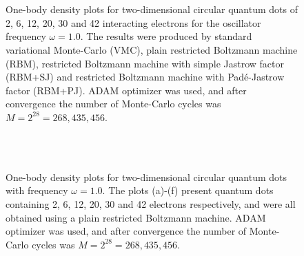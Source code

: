 \begin{figure}[H]
	\centering
	\\
	
	\\
	
	
	\caption{One-body density plots for two-dimensional circular quantum dots of 2, 6, 12, 20, 30 and 42 interacting electrons for the oscillator frequency $\omega=1.0$. The results were produced by standard variational Monte-Carlo (VMC), plain restricted Boltzmann machine (RBM), restricted Boltzmann machine with simple Jastrow factor (RBM+SJ) and restricted Boltzmann machine with Padé-Jastrow factor (RBM+PJ). ADAM optimizer was used, and after convergence the number of Monte-Carlo cycles was $M=2^{28}=268,435,456$.}
	\label{fig:OB_interaction_2D_1p0w}
\end{figure}

\begin{figure}
	\centering
	\hspace{-0.0cm}
	\\
	
	\hspace{-0.0cm}
	\\
	
	\caption{One-body density plots for two-dimensional circular quantum dots with frequency $\omega=1.0$. The plots (a)-(f) present quantum dots containing 2, 6, 12, 20, 30 and 42 electrons respectively, and were all obtained using a plain restricted Boltzmann machine. ADAM optimizer was used, and after convergence the number of Monte-Carlo cycles was $M=2^{28}=268,435,456$.}
	\label{fig:OB_interaction_VMC_1p0w1}
\end{figure}

